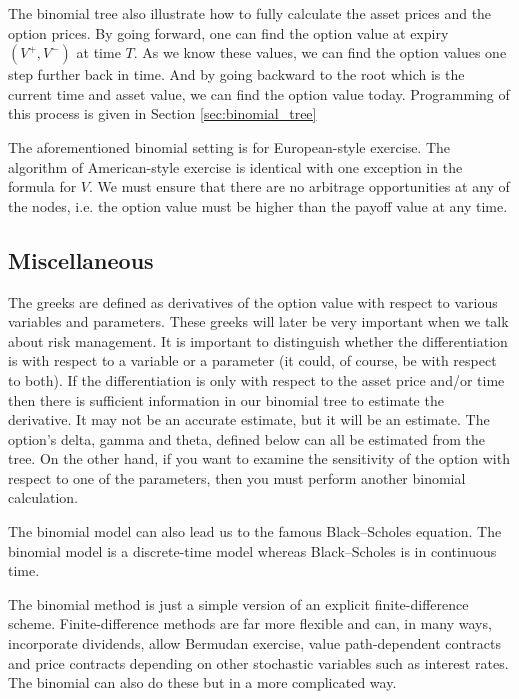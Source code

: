 The binomial tree also illustrate how to fully calculate the asset prices and the option prices. By going forward, one can find the option value at expiry $(V^+, V^-)$ at time $T$. As we know these values, we can find the option values one step further back in time. And by going backward to the root which is the current time and asset value, we can find the option value today. Programming of this process is given in Section \ref{sec:binomial_tree}

The aforementioned binomial setting is for European-style exercise. The algorithm of American-style exercise is identical with one exception  in the formula for $V$. We must ensure that there are no arbitrage opportunities at any of the nodes, i.e. the option value must be higher than the payoff value at any time.


\subsection{Miscellaneous}
The greeks are defined as derivatives of the option value with respect to various variables and parameters. These greeks will later be very important when we talk about risk management. It is important to distinguish whether the differentiation is with respect to a variable or a parameter (it could, of course, be with respect to both). If the differentiation is only with respect to the asset price and/or time then there is sufficient information in our binomial tree to estimate the derivative. It may not be an accurate estimate, but it will be an estimate. The option’s delta, gamma and theta, defined below can all be estimated from the tree. On the other hand, if you want to examine the sensitivity of the option with respect to one of the parameters, then you must perform another binomial calculation.

The binomial model can also lead us to the famous Black–Scholes equation. The binomial model is a discrete-time model whereas Black–Scholes is in continuous time.

The binomial method is just a simple version of an explicit finite-difference scheme. Finite-difference methods are far more flexible and can, in many ways, incorporate dividends, allow Bermudan exercise, value path-dependent contracts and price contracts depending on other stochastic variables such as interest rates. The binomial can also do these but in a more complicated way. 


